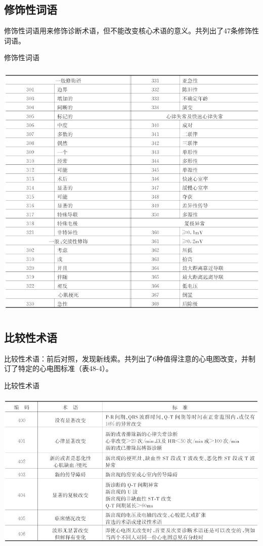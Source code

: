 \subsection{修饰性词语}

修饰性词语用来修饰诊断术语，但不能改变核心术语的意义。共列出了47条修饰性词语。

\begin{table}[htbp]
\centering
\caption{修饰性词语}
\label{tab48-3}
\includegraphics[width=5.44792in,height=5.01042in]{./images/Image00752.jpg}
\end{table}

\protect\hypertarget{text00057.htmlux5cux23subid706}{}{}

\subsection{比较性术语}

比较性术语：前后对照，发现新线索。共列出了6种值得注意的心电图改变，并制订了特定的心电图标准（表48-4）。

\begin{table}[htbp]
\centering
\caption{比较性术语}
\label{tab48-4}
\includegraphics[width=5.44792in,height=3.03125in]{./images/Image00753.jpg}
\end{table}

